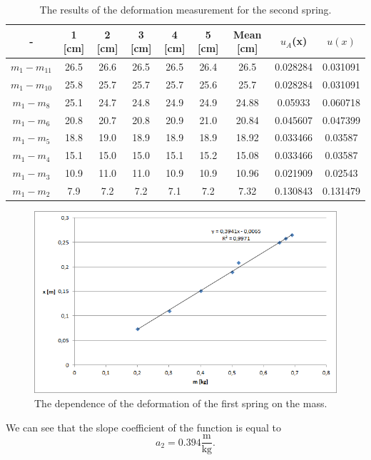\documentclass[a4paper,12pt,titlepage,bibliography=numbered]{article}
\begin{document}
\begin{table}[H]
\centering
\caption{The results of the deformation measurement for the second spring.}
\begin{tabular}{|c|c|c|c|c|c|c|c|c|}
\hline
\textbf{-} & \textbf{1 [cm]} & \textbf{2 [cm]} & \textbf{3 [cm]} & \textbf{4 [cm]} & \textbf{5 [cm]} & \textbf{Mean [cm]} & \textbf{$u_A$(x)} & \textbf{$u(x)$} \\ 
\hline
$m_1 - m_{11}$ & 26.5 & 26.6 & 26.5 & 26.5 & 26.4 & 26.5 & 0.028284 & 0.031091 \\ 
\hline
$m_1 - m_{10}$ & 25.8 & 25.7 & 25.7 & 25.7 & 25.6 & 25.7 & 0.028284 & 0.031091 \\ 
\hline
$m_1 - m_8$ & 25.1 & 24.7 & 24.8 & 24.9 & 24.9 & 24.88 & 0.05933 & 0.060718 \\ 
\hline
$m_1 - m_6$ & 20.8 & 20.7 & 20.8 & 20.9 & 21.0 & 20.84 & 0.045607 & 0.047399 \\ 
\hline
$m_1 - m_5$ & 18.8 & 19.0 & 18.9 & 18.9 & 18.9 & 18.92 & 0.033466 & 0.03587 \\ 
\hline
$m_1 - m_4$ & 15.1 & 15.0 & 15.0 & 15.1 & 15.2 & 15.08 & 0.033466 & 0.03587 \\ 
\hline
$m_1 - m_3$ & 10.9 & 11.0 & 11.0 & 10.9 & 10.9 & 10.96 & 0.021909 & 0.02543 \\ 
\hline
$m_1 - m_2$ & 7.9 & 7.2 & 7.2 & 7.1 & 7.2 & 7.32 & 0.130843 & 0.131479 \\ 
\hline
\end{tabular}
\end{table}

\begin{figure}[H]
\centering
\includegraphics[width=1\textwidth]{fig2.png}
\caption{The dependence of the deformation of the first spring on the mass.}
\label{fig_2}
\end{figure}
\noindent We can see that the slope coefficient of the function is equal to
\begin{equation}
    a_2 = 0.394 \mathrm{\frac{m}{kg}}.
\end{equation}
\end{document}
